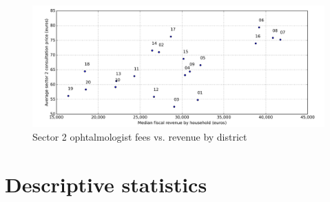 \documentclass[11pt]{article}
\begin{document}
\begin{figure}[H]
    \caption{Sector 2 ophtalmologist fees vs. revenue by district}
	\centering
		\includegraphics[width=16cm]{images/Ophtalmo_Ardt_ConsultationS2VsRevenue.png}
\end{figure}

\clearpage

\appendix

\section{Descriptive statistics}
\end{document}
